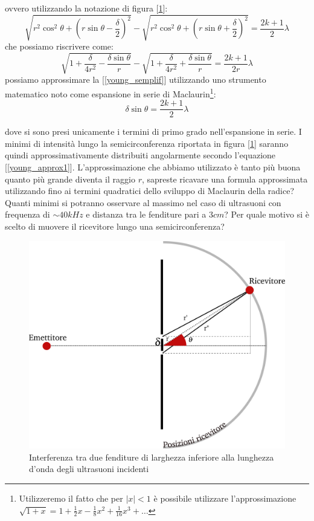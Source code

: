 \documentclass[a4paper,10pt,oneside]{article}
\begin{document}
ovvero utilizzando la notazione di figura [\ref{fig:young_schema}]:
\begin{equation}\label{young_completa}
 \sqrt{r^2\cos^2\theta+(r\sin\theta-\frac \delta 2)^2}-\sqrt{r^2\cos^2\theta+(r\sin\theta+\frac \delta 2)^2}=\frac{2k+1}{2}\lambda
\end{equation}
che possiamo riscrivere come:
\begin{equation}\label{young_semplif}
 \sqrt{1+\frac{\delta}{4r^2}-\frac{\delta\sin\theta}{r}}-\sqrt{1+\frac{\delta}{4r^2}+\frac{\delta\sin\theta}{r}}=\frac{2k+1}{2r}\lambda
\end{equation}
possiamo approssimare la [\ref{young_semplif}] utilizzando uno strumento matematico noto come espansione in serie di Maclaurin\footnote{Utilizzeremo il fatto che per $|x|<1$ è possibile utilizzare l'approssimazione $\sqrt{1+x}=1+\frac 1 2 x -\frac 1 8 x^2 +\frac{1}{16} x^3+\ldots$}:
\begin{equation}\label{young_approx1}
 \delta\sin\theta=\frac{2k+1}{2}\lambda
\end{equation}

dove si sono presi unicamente i termini di primo grado nell'espansione in serie. I minimi di intensità lungo la semicirconferenza riportata in figura [\ref{fig:young_schema}] saranno quindi approssimativamente distribuiti angolarmente secondo l'equazione [\ref{young_approx1}]. L'approssimazione che abbiamo utilizzato è tanto più buona quanto più grande diventa il raggio $r$, sapreste ricavare una formula approssimata utilizzando fino ai termini quadratici dello sviluppo di Maclaurin della radice? Quanti minimi si potranno osservare al massimo nel caso di ultrasuoni con frequenza di $\sim 40kHz$ e distanza tra le fenditure pari a $3cm$? Per quale motivo si è scelto di muovere il ricevitore lungo una semicirconferenza?


\begin{figure}[H]
 \centering
 \includegraphics[width=\textwidth]{../Immagini/young.png}
 \caption{Interferenza tra due fenditure di larghezza inferiore alla lunghezza d'onda degli ultrasuoni incidenti}
 \label{fig:young_schema}
\end{figure}
\end{document}
